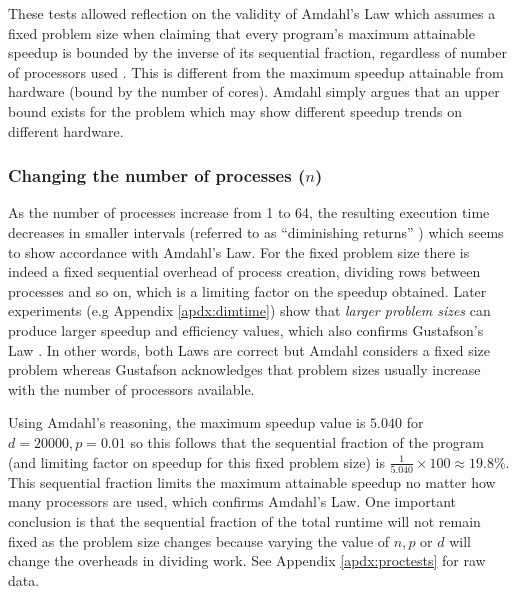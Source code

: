 \documentclass[11pt]{article}
\begin{document}
These tests allowed reflection on the validity of Amdahl's Law which assumes a fixed problem size when claiming that every program's maximum attainable speedup is bounded by the inverse of its sequential fraction, regardless of number of processors used \cite{amdahl2000}. This is different from the maximum speedup attainable from hardware (bound by the number of cores). Amdahl simply argues that an upper bound exists for the problem which may show different speedup trends on different hardware.

{\color{darkpurple}
\subsubsection*{Changing the number of processes ($n$)}}
As the number of processes increase from 1 to 64, the resulting execution time decreases in smaller intervals (referred to as ``diminishing returns'' \cite{padua2011}) which seems to show accordance with Amdahl's Law. For the fixed problem size there is indeed a fixed sequential overhead of process creation, dividing rows between processes and so on, which is a limiting factor on the speedup obtained. Later experiments (e.g Appendix \ref{apdx:dimtime}) show that \textit{larger problem sizes} can produce larger speedup and efficiency values, which also confirms Gustafson's Law \cite{gustafson1988}. In other words, both Laws are correct but Amdahl considers a fixed size problem whereas Gustafson acknowledges that problem sizes usually increase with the number of processors available.

Using Amdahl's reasoning, the maximum speedup value is $5.040$  for $d=20000, p=0.01$ so this follows that the sequential fraction of the program (and limiting factor on speedup for this fixed problem size) is $\frac{1}{5.040} \times 100 \approx  19.8\%$. This sequential fraction limits the maximum attainable speedup no matter how many processors are used, which confirms Amdahl's Law. One important conclusion is that the sequential fraction of the total runtime will not remain fixed as the problem size changes because varying the value of $n, p$ or $d$ will change the overheads in dividing work. See Appendix \ref{apdx:proctests} for raw data.
\end{document}
